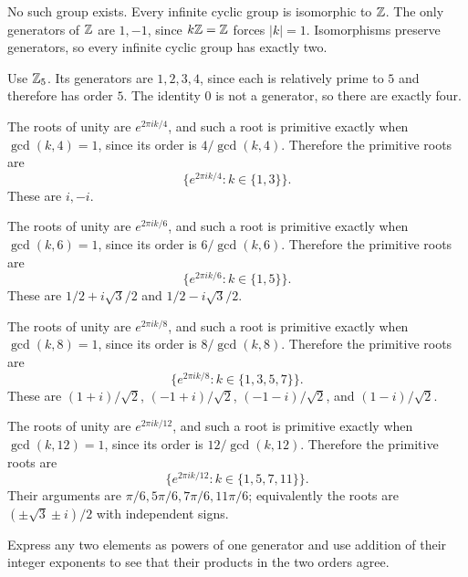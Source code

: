 
No such group exists. Every infinite cyclic group is isomorphic to $\mathbb{Z}$. The only generators of $\mathbb{Z}$ are $1,-1$, since $k\mathbb{Z}=\mathbb{Z}$ forces $|k|=1$. Isomorphisms preserve generators, so every infinite cyclic group has exactly two.


Use $\mathbb{Z}_5$. Its generators are $1,2,3,4$, since each is relatively prime to $5$ and therefore has order $5$. The identity $0$ is not a generator, so there are exactly four.


The roots of unity are $e^{2\pi i k/4}$, and such a root is primitive exactly when $\gcd(k,4)=1$, since its order is $4/\gcd(k,4)$. Therefore the primitive roots are
\[\{e^{2\pi i k/4}:k\in\{1,3\}\}.
\]
These are $i,-i$.


The roots of unity are $e^{2\pi i k/6}$, and such a root is primitive exactly when $\gcd(k,6)=1$, since its order is $6/\gcd(k,6)$. Therefore the primitive roots are
\[\{e^{2\pi i k/6}:k\in\{1,5\}\}.
\]
These are $1/2+i\sqrt3/2$ and $1/2-i\sqrt3/2$.


The roots of unity are $e^{2\pi i k/8}$, and such a root is primitive exactly when $\gcd(k,8)=1$, since its order is $8/\gcd(k,8)$. Therefore the primitive roots are
\[\{e^{2\pi i k/8}:k\in\{1,3,5,7\}\}.
\]
These are $(1+i)/\sqrt2$, $(-1+i)/\sqrt2$, $(-1-i)/\sqrt2$, and $(1-i)/\sqrt2$.


The roots of unity are $e^{2\pi i k/12}$, and such a root is primitive exactly when $\gcd(k,12)=1$, since its order is $12/\gcd(k,12)$. Therefore the primitive roots are
\[\{e^{2\pi i k/12}:k\in\{1,5,7,11\}\}.
\]
Their arguments are $\pi/6,5\pi/6,7\pi/6,11\pi/6$; equivalently the roots are $(\pm\sqrt3\pm i)/2$ with independent signs.


Express any two elements as powers of one generator and use addition of their integer exponents to see that their products in the two orders agree.


